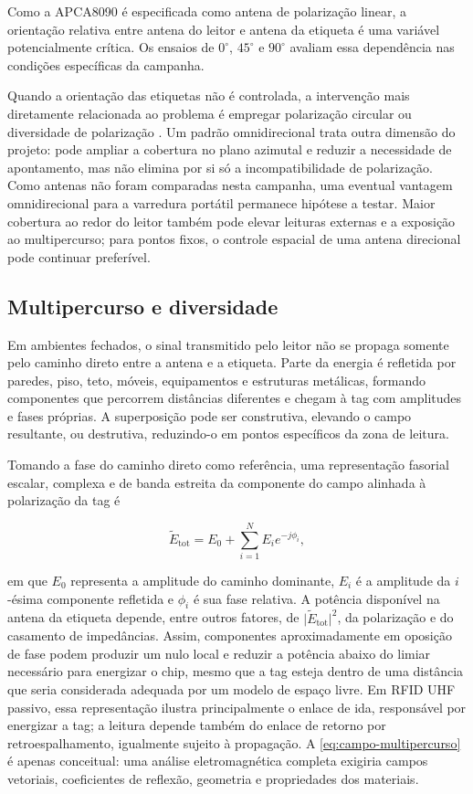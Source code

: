 Como a APCA8090 é especificada como antena de polarização linear, a orientação relativa entre antena do leitor e antena da etiqueta é uma variável potencialmente crítica. Os ensaios de $0^\circ$, $45^\circ$ e $90^\circ$ avaliam essa dependência nas condições específicas da campanha.

Quando a orientação das etiquetas não é controlada, a intervenção mais diretamente relacionada ao problema é empregar polarização circular ou diversidade de polarização \cite{times72022polarization}. Um padrão omnidirecional trata outra dimensão do projeto: pode ampliar a cobertura no plano azimutal e reduzir a necessidade de apontamento, mas não elimina por si só a incompatibilidade de polarização. Como antenas não foram comparadas nesta campanha, uma eventual vantagem omnidirecional para a varredura portátil permanece hipótese a testar. Maior cobertura ao redor do leitor também pode elevar leituras externas e a exposição ao multipercurso; para pontos fixos, o controle espacial de uma antena direcional pode continuar preferível.

\subsection{Multipercurso e diversidade}

Em ambientes fechados, o sinal transmitido pelo leitor não se propaga somente pelo caminho direto entre a antena e a etiqueta. Parte da energia é refletida por paredes, piso, teto, móveis, equipamentos e estruturas metálicas, formando componentes que percorrem distâncias diferentes e chegam à tag com amplitudes e fases próprias. A superposição pode ser construtiva, elevando o campo resultante, ou destrutiva, reduzindo-o em pontos específicos da zona de leitura.

Tomando a fase do caminho direto como referência, uma representação fasorial escalar, complexa e de banda estreita da componente do campo alinhada à polarização da tag é

\begin{equation}
    \widetilde{E}_{\mathrm{tot}}
    = E_{0} + \sum_{i=1}^{N} E_i e^{-j\phi_i},
    \label{eq:campo-multipercurso}
\end{equation}

em que $E_0$ representa a amplitude do caminho dominante, $E_i$ é a amplitude da $i$-ésima componente refletida e $\phi_i$ é sua fase relativa. A potência disponível na antena da etiqueta depende, entre outros fatores, de $\lvert\widetilde{E}_{\mathrm{tot}}\rvert^2$, da polarização e do casamento de impedâncias. Assim, componentes aproximadamente em oposição de fase podem produzir um nulo local e reduzir a potência abaixo do limiar necessário para energizar o chip, mesmo que a tag esteja dentro de uma distância que seria considerada adequada por um modelo de espaço livre. Em RFID UHF passivo, essa representação ilustra principalmente o enlace de ida, responsável por energizar a tag; a leitura depende também do enlace de retorno por retroespalhamento, igualmente sujeito à propagação. A \autoref{eq:campo-multipercurso} é apenas conceitual: uma análise eletromagnética completa exigiria campos vetoriais, coeficientes de reflexão, geometria e propriedades dos materiais.

